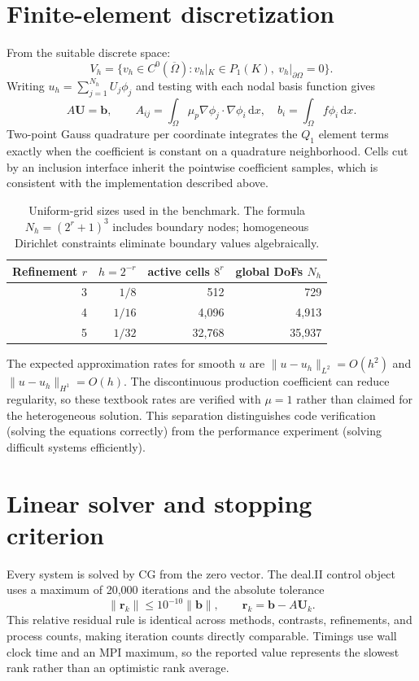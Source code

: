 \documentclass[10pt,a4paper]{article}
\begin{document}
\section{Finite-element discretization}
From the suitable discrete space:
\begin{equation}
 V_h=\{v_h\in C^0(\overline\Omega):v_h|_K\in P_1(K),\ v_h|_{\partial\Omega}=0\}.
\end{equation}
Writing $u_h=\sum_{j=1}^{N_h}U_j\phi_j$ and testing with each nodal basis function gives
\begin{equation}
 A\boldsymbol U=\boldsymbol b,\qquad
 A_{ij}=\int_\Omega\mu_p\nabla\phi_j\cdot\nabla\phi_i\,\mathrm dx,
 \quad b_i=\int_\Omega f\phi_i\,\mathrm dx.
 \label{eq:discrete}
\end{equation}
Two-point Gauss quadrature per coordinate integrates the $Q_1$ element terms exactly when the
coefficient is constant on a quadrature neighborhood. Cells cut by an inclusion interface inherit
the pointwise coefficient samples, which is consistent with the implementation described above.

\begin{table}[h]
\centering
\caption{Uniform-grid sizes used in the benchmark. The formula $N_h=(2^r+1)^3$ includes
boundary nodes; homogeneous Dirichlet constraints eliminate boundary values algebraically.}
\begin{tabular}{rrrr}
\toprule
Refinement $r$ & $h=2^{-r}$ & active cells $8^r$ & global DoFs $N_h$\\
\midrule
3 & $1/8$  & 512    & 729\\
4 & $1/16$ & 4,096  & 4,913\\
5 & $1/32$ & 32,768 & 35,937\\
\bottomrule
\end{tabular}
\label{tab:meshes}
\end{table}

The expected approximation rates for smooth $u$ are
$\|u-u_h\|_{L^2}=O(h^2)$ and $\|u-u_h\|_{H^1}=O(h)$. The discontinuous production
coefficient can reduce regularity, so these textbook rates are verified with $\mu=1$ rather than
claimed for the heterogeneous solution. This separation distinguishes code verification (solving
the equations correctly) from the performance experiment (solving difficult systems efficiently).

\newpage
\section{Linear solver and stopping criterion}
Every system is solved by CG from the zero vector. The deal.II control object uses a maximum of
20,000 iterations and the absolute tolerance
\begin{equation}
 \|\boldsymbol r_k\|\le10^{-10}\|\boldsymbol b\|,
 \qquad \boldsymbol r_k=\boldsymbol b-A\boldsymbol U_k.
 \label{eq:stopping}
\end{equation}
This relative residual rule is identical across methods, contrasts, refinements, and process counts,
making iteration counts directly comparable. Timings use wall clock time and an MPI maximum, so
the reported value represents the slowest rank rather than an optimistic rank average.
\end{document}

